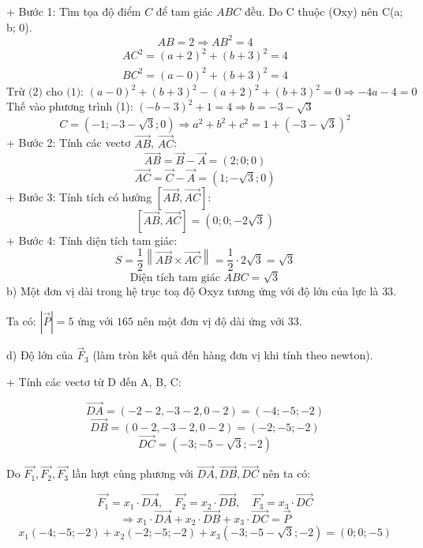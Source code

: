 \documentclass[a4paper,12pt]{article}
\begin{document}
+ Bước 1: Tìm tọa độ điểm \(C\) để tam giác \(ABC\) đều.
Do C thuộc (Oxy) nên C(a; b; 0).
\[ AB = 2 \Rightarrow AB^2 = 4 \]
\begin{align}
AC^2 = (a +2)^2 + (b +3)^2 = 4 \tag{1} \\
BC^2 = (a - 0)^2 + (b +3)^2 = 4 \tag{2}
\end{align}
\[\text{Trừ (2) cho (1): }(a - 0)^2 + (b + 3)^2 - (a + 2)^2 + (b + 3)^2 = 0 \Rightarrow - 4 a - 4 = 0\]
Thế vào phương trình (1): \(\left(- b - 3\right)^{2} + 1 = 4 \Rightarrow b=-3 - \sqrt{3}\)
\[C = (-1; -3 - \sqrt{3}; 0) \Rightarrow a^2+b^2+c^2=1 + \left(-3 - \sqrt{3}\right)^{2}\]
+ Bước 2: Tính các vectơ \(\overrightarrow{AB}\), \(\overrightarrow{AC}\):
\[ \overrightarrow{AB} = \overrightarrow{B} - \overrightarrow{A} = (2; 0; 0) \]
\[ \overrightarrow{AC} = \overrightarrow{C} - \overrightarrow{A} = (1; - \sqrt{3}; 0) \]
+ Bước 3: Tính tích có hướng \(\left[\overrightarrow{AB}, \overrightarrow{AC}\right]\):
\[ [\overrightarrow{AB},  \overrightarrow{AC}] = (0; 0; - 2 \sqrt{3}) \]
+ Bước 4: Tính diện tích tam giác:
\[
S = \frac{1}{2} \left\| \overrightarrow{AB} \times \overrightarrow{AC} \right\| = \frac{1}{2} \cdot 2 \sqrt{3}
= \sqrt{3}
\]
\[\text{Diện tích tam giác } ABC = \sqrt{3}\]
b) Một đơn vị dài trong hệ trục toạ độ Oxyz tương ứng với độ lớn của lực là \(33\).


Ta có: \(|\overrightarrow{P}| = 5\) ứng với \(165\) nên một đơn vị độ dài ứng với \(33\).




d) Độ lớn của \(\overrightarrow{F}_3\) (làm tròn kết quả đến hàng đơn vị khi tính theo newton).


+ Tính các vectơ từ D đến A, B, C:


\[ \overrightarrow{DA} = (-2 - 2, -3 - 2, 0 - 2) = (-4; -5; -2) \]
\[ \overrightarrow{DB} = (0 - 2, -3 - 2, 0 - 2) = (-2; -5; -2) \]
\[ \overrightarrow{DC} = (-3; -5 - \sqrt{3}; -2) \]


Do \(\overrightarrow{F_1},\overrightarrow{F_2}, \overrightarrow{F_3}\) lần lượt cùng phương với \(\overrightarrow{DA}, \overrightarrow{DB}, \overrightarrow{DC}\) nên ta có:


\[ \overrightarrow{F_1} = x_1 \cdot \overrightarrow{DA},\quad \overrightarrow{F_2} = x_2 \cdot \overrightarrow{DB},\quad \overrightarrow{F_3} = x_3 \cdot \overrightarrow{DC} \]
\[ \Rightarrow x_1 \cdot \overrightarrow{DA} + x_2 \cdot \overrightarrow{DB} + x_3 \cdot \overrightarrow{DC} = \overrightarrow{P} \]
\[ x_1(-4; -5; -2) + x_2(-2; -5; -2) + x_3(-3; -5 - \sqrt{3}; -2) = (0; 0; -5) \]
\end{document}

